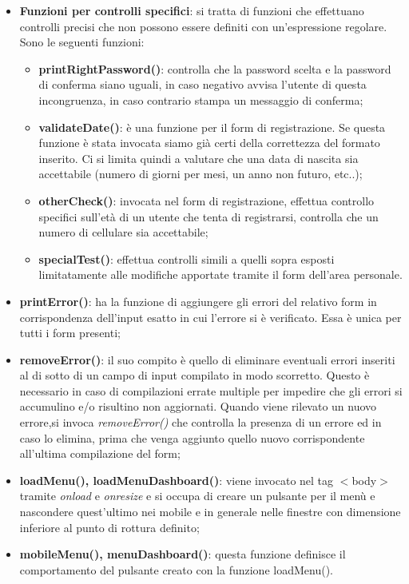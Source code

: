 \begin{itemize}
    \item \textbf{Funzioni per controlli specifici}: si tratta di funzioni che effettuano controlli precisi che non possono essere definiti con un'espressione regolare. Sono le seguenti funzioni:
    \begin{itemize}
        \item \textbf{printRightPassword()}: controlla che la password scelta e la password di conferma siano uguali, in caso negativo avvisa l'utente di questa incongruenza, in caso contrario stampa un messaggio di conferma;
        \item \textbf{validateDate()}: è una funzione per il form di registrazione. Se questa funzione è stata invocata siamo già certi della correttezza del formato inserito. Ci si limita quindi a valutare che una data di nascita sia accettabile (numero di giorni per mesi, un anno non futuro, etc..);
        \item \textbf{otherCheck()}: invocata nel form di registrazione, effettua controllo specifici sull'età di un utente che tenta di registrarsi, controlla che un numero di cellulare sia accettabile;
        \item \textbf{specialTest()}: effettua controlli simili a quelli sopra esposti limitatamente alle modifiche apportate tramite il form dell'area personale.
    \end{itemize}
    
    \item \textbf{printError()}: ha la funzione di aggiungere gli errori del relativo form in corrispondenza dell'input esatto in cui l'errore si è verificato. Essa è unica per tutti i form presenti;
    
    \item \textbf{removeError()}: il suo compito è quello di eliminare eventuali errori inseriti al di sotto di un campo di input compilato in modo scorretto. Questo è necessario in caso di compilazioni errate multiple per impedire che gli errori si accumulino e/o risultino non aggiornati. Quando viene rilevato un nuovo errore,si invoca \textit{removeError()} che controlla la presenza di un errore ed in caso lo elimina, prima che venga aggiunto quello nuovo corrispondente all'ultima compilazione del form;
    
    \item \textbf{loadMenu(), loadMenuDashboard()}: viene invocato nel tag $<$body$>$ tramite \textit{onload} e \textit{onresize} e si occupa di creare un pulsante per il menù e nascondere quest'ultimo nei mobile e in generale nelle finestre con dimensione inferiore al punto di rottura definito;
    
    \item \textbf{mobileMenu(), menuDashboard()}: questa funzione definisce il comportamento del pulsante creato con la funzione loadMenu().
    
\end{itemize}

